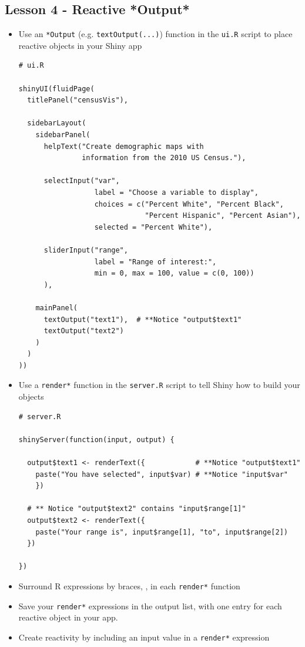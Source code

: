 \documentclass{article}
\begin{document}
\subsection*{Lesson 4 - Reactive *Output*}
\begin{itemize}
\item Use an \verb|*Output| (e.g. \verb|textOutput(...)|) function in the \verb|ui.R| script to place reactive objects in your Shiny app
\begin{verbatim}
# ui.R

shinyUI(fluidPage(
  titlePanel("censusVis"),
  
  sidebarLayout(
    sidebarPanel(
      helpText("Create demographic maps with 
               information from the 2010 US Census."),
      
      selectInput("var", 
                  label = "Choose a variable to display",
                  choices = c("Percent White", "Percent Black",
                              "Percent Hispanic", "Percent Asian"),
                  selected = "Percent White"),
      
      sliderInput("range", 
                  label = "Range of interest:",
                  min = 0, max = 100, value = c(0, 100))
      ),
    
    mainPanel(
      textOutput("text1"),  # **Notice "output$text1"
      textOutput("text2")
    )
  )
))
\end{verbatim}
\item Use a \verb|render*| function in the \verb|server.R| script to tell Shiny how to build your objects
\begin{verbatim}
# server.R

shinyServer(function(input, output) {

  output$text1 <- renderText({            # **Notice "output$text1"
    paste("You have selected", input$var) # **Notice "input$var"
    }) 
    
  # ** Notice "output$text2" contains "input$range[1]"  
  output$text2 <- renderText({
    paste("Your range is", input$range[1], "to", input$range[2])
  })
    
})
\end{verbatim}
\item Surround R expressions by braces, {}, in each \verb|render*| function
\item Save your \verb|render*| expressions in the output list, with one entry for each reactive object in your app.
\item Create reactivity by including an input value in a \verb|render*| expression
\end{itemize}
\end{document}
